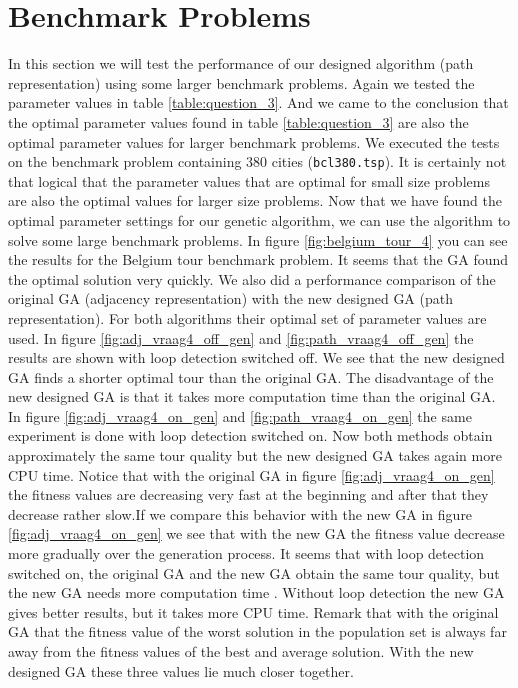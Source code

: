 

\section{Benchmark Problems}

In this section we will test the performance of our designed algorithm (path representation) using some larger benchmark problems. Again we tested the parameter values in table \ref{table:question_3}. And we came to the conclusion that the optimal parameter values found in table \ref{table:question_3} are also the optimal parameter values for larger benchmark problems. We executed the tests on the benchmark problem containing 380 cities (\texttt{bcl380.tsp}). It is certainly not that logical that the parameter values that are optimal for small size problems are also the optimal values for larger size problems. Now that we have found the optimal parameter settings for our genetic algorithm, we can use the algorithm to solve some large benchmark problems.
In figure \ref{fig:belgium_tour_4} you can see the results for the Belgium tour benchmark problem. It seems that the GA found the optimal solution very quickly. 
\newline
\newline
We also did a performance comparison of the original GA (adjacency representation) with the new designed GA (path representation). For both algorithms their optimal set of parameter values are used. In figure \ref{fig:adj_vraag4_off_gen} and \ref{fig:path_vraag4_off_gen} the results are shown with loop detection switched off. We see that the new designed GA finds a shorter optimal tour than the original GA. The disadvantage of the new designed GA is that it takes more computation time than the original GA. In figure \ref{fig:adj_vraag4_on_gen} and \ref{fig:path_vraag4_on_gen} the same experiment is done with loop detection switched on. Now both methods obtain approximately the same tour quality but the new designed GA takes again more CPU time. Notice that with the original GA in figure \ref{fig:adj_vraag4_on_gen} the fitness values are decreasing very fast at the beginning and after that they decrease rather slow.If we compare this behavior with the new GA in figure \ref{fig:adj_vraag4_on_gen} we see that with the new GA the fitness value decrease more gradually over the generation process. 
\newline
\newline
It seems that with loop detection switched on, the original GA and the new GA obtain the same tour quality, but the new GA needs more computation time . Without loop detection the new GA gives better results, but it takes more CPU time. Remark that with the original GA that the fitness value of the worst solution in the population set is always far away from the fitness values of the best and average solution. With the new designed GA these three values lie much closer together.

